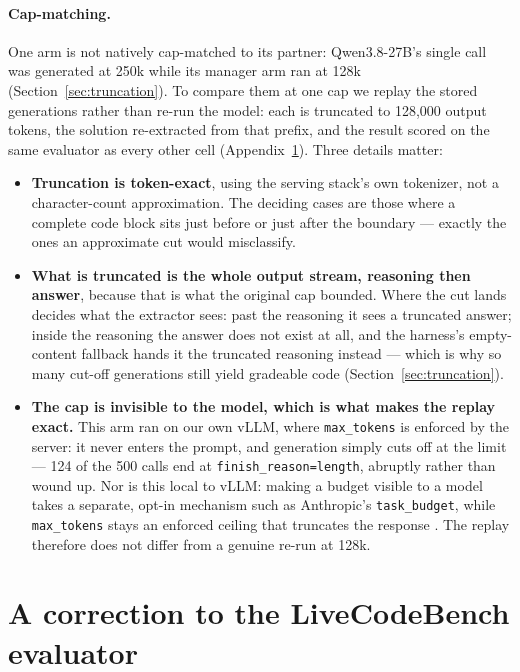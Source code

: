 \documentclass{article}
\begin{document}
\paragraph{Cap-matching.} One arm is not natively cap-matched to its partner: Qwen3.8-27B's single
call was generated at 250k while its manager arm ran at 128k (Section~\ref{sec:truncation}). To
compare them at one cap we replay the stored generations rather than re-run the model: each is
truncated to 128,000 output tokens, the solution re-extracted from that prefix, and the result
scored on the same evaluator as every other cell (Appendix~\ref{app:evaluator}). Three details
matter:

\begin{itemize}
  \item \textbf{Truncation is token-exact}, using the serving stack's own tokenizer, not a
  character-count approximation. The deciding cases are those where a complete code block sits just
  before or just after the boundary --- exactly the ones an approximate cut would misclassify.

  \item \textbf{What is truncated is the whole output stream, reasoning then answer}, because that
  is what the original cap bounded. Where the cut lands decides what the extractor sees: past the
  reasoning it sees a truncated answer; inside the reasoning the answer does not exist at all, and
  the harness's empty-content fallback hands it the truncated reasoning instead --- which is why so
  many cut-off generations still yield gradeable code (Section~\ref{sec:truncation}).

  \item \textbf{The cap is invisible to the model, which is what makes the replay exact.} This arm
  ran on our own vLLM, where \texttt{max\_tokens} is enforced by the server: it never enters the
  prompt, and generation simply cuts off at the limit --- 124 of the 500 calls end at
  \texttt{finish\_reason=length}, abruptly rather than wound up. Nor is this local to vLLM: making a
  budget visible to a model takes a separate, opt-in mechanism such as Anthropic's
  \texttt{task\_budget}, while \texttt{max\_tokens} stays an enforced ceiling that truncates the
  response \citep{anthropic2026effort}. The replay therefore does not differ from a genuine re-run
  at 128k.
\end{itemize}

\section{A correction to the LiveCodeBench evaluator}
\label{app:evaluator}
\end{document}
